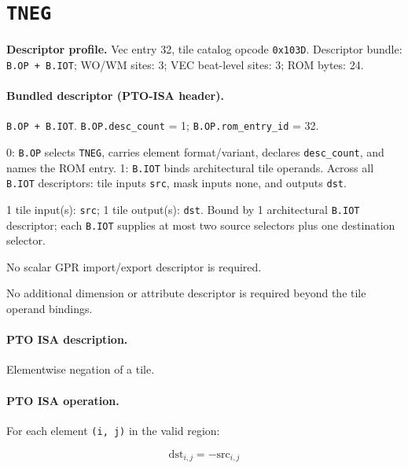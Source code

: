 \section{\texttt{TNEG}}
\noindent\textbf{Descriptor profile.} Vec entry 32, tile catalog opcode \texttt{0x103D}. Descriptor bundle: \texttt{B.OP + B.IOT}; WO/WM sites: 3; VEC beat-level sites: 3; ROM bytes: 24.\par\smallskip
{}
\paragraph{Bundled descriptor (PTO-ISA header).}
\begin{description}[leftmargin=0.18\linewidth,style=nextline]
\item[Bundle] \texttt{B.OP + B.IOT}. \texttt{B.OP.desc\_count} = 1; \texttt{B.OP.rom\_entry\_id} = 32.
\item[Assembly] 0: \texttt{B.OP} selects \texttt{TNEG}, carries element format/variant, declares \texttt{desc\_count}, and names the ROM entry. 1: \texttt{B.IOT} binds architectural tile operands. Across all \texttt{B.IOT} descriptors: tile inputs \texttt{src}, mask inputs none, and outputs \texttt{dst}.
\item[Tile operands] 1 tile input(s): \texttt{src}; 1 tile output(s): \texttt{dst}. Bound by 1 architectural \texttt{B.IOT} descriptor; each \texttt{B.IOT} supplies at most two source selectors plus one destination selector.
\item[Scalar GPR operands] No scalar GPR import/export descriptor is required.
\item[Metadata operands] No additional dimension or attribute descriptor is required beyond the tile operand bindings.
\end{description}
\par\smallskip
{\small
\paragraph{PTO ISA description.}
Elementwise negation of a tile.
\paragraph{PTO ISA operation.}
For each element \texttt{(i, j)} in the valid region:

\[
\mathrm{dst}_{i,j} = -\mathrm{src}_{i,j}
\]
}\par\smallskip
